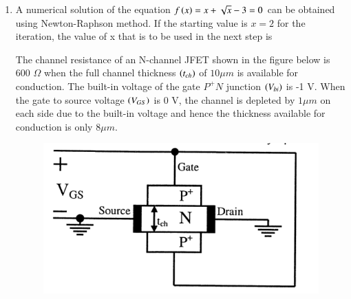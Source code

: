 \documentclass[a4paper, 11pt]{article}
\begin{document}
\begin{enumerate}
    \begin{enumerate}
    \end{enumerate}
    
    \hfill{}

    \item A numerical solution of the equation $f\left(x\right)=x+\sqrt{x}-3=0$ can be obtained using Newton-Raphson method. If the starting value is $x=2$ for the iteration, the value of x that is to be used in the next step is
    
    \begin{enumerate}
    \end{enumerate}
    \hfill{}
    
    The channel resistance of an N-channel JFET shown in the figure below is 600 $\Omega$ when the full channel thickness $\left(t_{ch}\right)$ of $10 \mu m$ is available for conduction. The built-in voltage of the gate $P^{+}N$ junction $\left(V_{bi}\right)$ is -1 V. When the gate to source voltage $\left(V_{GS}\right)$ is 0 V, the channel is depleted by $1 \mu m$ on each side due to the built-in voltage and hence the thickness available for conduction is only $8 \mu m$.
    \begin{figure}[H]
        \centering
        \includegraphics[width=0.3\columnwidth]{figs/q48_49.png}
        \caption*{}
        \label{fig:q48_49}
    \end{figure}


\end{enumerate}
\end{document}
